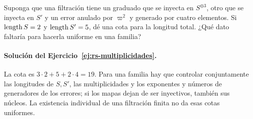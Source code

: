 \begin{ejercicio}\label{ej:rs-multiplicidades}
Suponga que una filtración tiene un graduado que se inyecta en
$S^{\oplus3}$, otro que se inyecta en $S'$ y un error anulado
por $\varpi^2$ y generado por cuatro elementos. Si
$\operatorname{length} S=2$ y $\operatorname{length} S'=5$, dé una cota para la longitud
total. ¿Qué dato faltaría para hacerla uniforme en una familia?
\end{ejercicio}

\paragraph{Solución del Ejercicio~\ref{ej:rs-multiplicidades}.}
La cota es $3\cdot2+5+2\cdot4=19$.
Para una familia hay que controlar conjuntamente las longitudes
de $S,S'$, las multiplicidades y los exponentes y números de
generadores de los errores; si los mapas dejan de ser inyectivos,
también sus núcleos. La existencia individual de una filtración
finita no da esas cotas uniformes.
